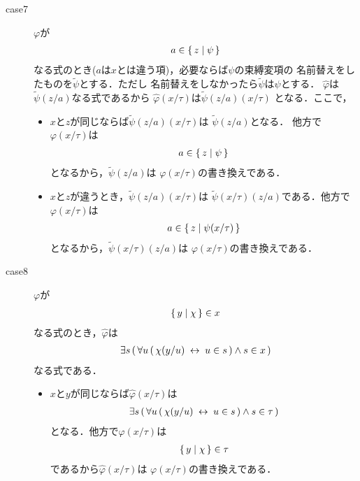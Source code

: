 \begin{metaprf}
\begin{description}
\begin{description}
					\item[case7] $\varphi$が
						\begin{align}
							a \in \{\, z \mid \psi\, \}
						\end{align}
						なる式のとき($a$は$x$とは違う項)，必要ならば$\psi$の束縛変項の
						名前替えをしたものを$\widetilde{\psi}$とする．ただし
						名前替えをしなかったら$\widetilde{\psi}$は$\psi$とする．
						$\widehat{\varphi}$は$\widetilde{\psi}(z/a)$なる式であるから
						$\widehat{\varphi}(x/\tau)$は$\widetilde{\psi}(z/a)(x/\tau)$
						となる．ここで，
						\begin{itemize}
							\item $x$と$z$が同じならば$\widetilde{\psi}(z/a)(x/\tau)$は
								$\widetilde{\psi}(z/a)$となる．
								他方で$\varphi(x/\tau)$は
								\begin{align}
									a \in \{\, z \mid \psi\, \}
								\end{align}
								となるから，$\widetilde{\psi}(z/a)$は
								$\varphi(x/\tau)$の書き換えである．
								
							\item $x$と$z$が違うとき，$\tilde{\psi}(z/a)(x/\tau)$は
								$\widetilde{\psi}(x/\tau)(z/a)$である．他方で
								$\varphi(x/\tau)$は
								\begin{align}
									a \in \{\, z \mid \psi(x/\tau)\, \}
								\end{align}
								となるから，$\widetilde{\psi}(x/\tau)(z/a)$は
								$\varphi(x/\tau)$の書き換えである．
						\end{itemize}
					
					\item[case8] $\varphi$が
						\begin{align}
							\{\, y \mid \chi\, \} \in x
						\end{align}
						なる式のとき，$\widehat{\varphi}$は
						\begin{align}
							\exists s\, (\, \forall u\, (\, \chi(y/u) \hspace{0.25em}\leftrightarrow\hspace{0.25em} u \in s\, ) \wedge s \in x\, )
						\end{align}
						なる式である．
						\begin{itemize}
							\item $x$と$y$が同じならば$\widehat{\varphi}(x/\tau)$は
								\begin{align}
									\exists s\, (\, \forall u\, (\, \chi(y/u) \hspace{0.25em}\leftrightarrow\hspace{0.25em} u \in s\, ) \wedge s \in \tau\, )
								\end{align}
								となる．他方で$\varphi(x/\tau)$は
								\begin{align}
									\{\, y \mid \chi\, \} \in \tau
								\end{align}
								であるから$\widehat{\varphi}(x/\tau)$は
								$\varphi(x/\tau)$の書き換えである．
								

\end{itemize}
\end{description}
\end{description}
\end{metaprf}
